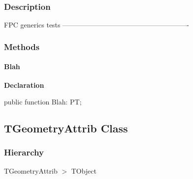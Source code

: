 \documentclass{report}
\newif\ifpdf
\begin{document}
\subsubsection*{\large{\textbf{Description}}\normalsize\hspace{1ex}\hfill}
FPC generics tests ------------------------------------------------------{-}\subsubsection*{\large{\textbf{Methods}}\normalsize\hspace{1ex}\hfill}
\paragraph*{Blah}\hspace*{\fill}

\label{ok_generic.TMyList-Blah}
\begin{list}{}{
\setlength{\itemindent}{0cm}
\setlength{\listparindent}{0cm}
\setlength{\leftmargin}{\evensidemargin}
\addtolength{\leftmargin}{\tmplength}
\settowidth{\labelsep}{X}
\addtolength{\leftmargin}{\labelsep}
\setlength{\labelwidth}{\tmplength}
}
\item[\textbf{Declaration}\hfill]
\ifpdf
\begin{flushleft}
\fi
\begin{ttfamily}
public function Blah: PT;\end{ttfamily}

\ifpdf
\end{flushleft}
\fi

\end{list}
\ifpdf
\subsection*{\large{\textbf{TGeometryAttrib Class}}\normalsize\hspace{1ex}\hrulefill}
\else
\subsection*{TGeometryAttrib Class}
\fi
\label{ok_generic.TGeometryAttrib}
\subsubsection*{\large{\textbf{Hierarchy}}\normalsize\hspace{1ex}\hfill}
TGeometryAttrib {$>$} TObject
\end{document}
